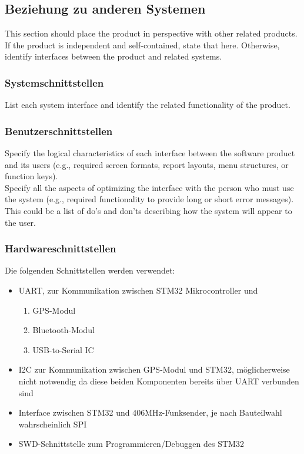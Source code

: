 \subsection{Beziehung zu anderen Systemen}
This section should place the product in perspective with other related products. If the product is independent and self-contained, state that here. Otherwise, identify interfaces between the product and related systems.

\subsubsection{Systemschnittstellen}
List each system interface and identify the related functionality of the product.

\subsubsection{Benutzerschnittstellen}
Specify the logical characteristics of each interface between the software product and its users (e.g., required screen formats, report layouts, menu structures, or function keys). \\[-0.3cm]

\noindent Specify all the aspects of optimizing the interface with the person who must use the system (e.g., required functionality to provide long or short error messages). This could be a list of do’s and don’ts describing how the system will appear to the user.

\subsubsection{Hardwareschnittstellen}
Die folgenden Schnittstellen werden verwendet:
\begin{itemize}
\item UART, zur Kommunikation zwischen STM32 Mikrocontroller und 
	\begin{enumerate}
	\item GPS-Modul
	\item Bluetooth-Modul 
	\item USB-to-Serial IC 
\end{enumerate}
\item I2C zur Kommunikation zwischen GPS-Modul und STM32, möglicherweise nicht notwendig da diese beiden Komponenten bereits über UART verbunden sind
\item Interface zwischen STM32 und 406MHz-Funksender, je nach Bauteilwahl wahrscheinlich SPI
\item SWD-Schnittstelle zum Programmieren/Debuggen des STM32
\end{itemize}


